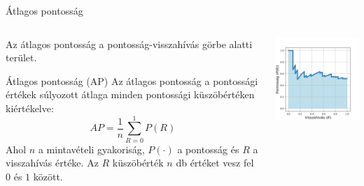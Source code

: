 \documentclass[english, aspectratio=169]{beamer}
\begin{document}
\begin{frame}{Átlagos pontosság}
\begin{columns}
\begin{column}{.5\textwidth}
Az átlagos pontosság a pontosság-visszahívás görbe alatti terület. 
\begin{block}{Átlagos pontosság (AP)}
Az átlagos pontosság a pontossági értékek súlyozott átlaga minden pontossági küszöbértéken kiértékelve:
\[
AP = \frac{1}{n} \sum_{R=0}^1 P(R)
\]
Ahol $n$ a mintavételi gyakoriság, $P(\cdot)$ a pontosság és $R$ a visszahívás értéke. Az $R$ küszöbérték $n$ db értéket vesz fel $0$ és $1$ között. 
\end{block}
\end{column}
\begin{column}{.5\textwidth}
\begin{center}
\includegraphics[width=7cm, keepaspectratio]{images/od_12.png}
\end{center}
\end{column}
\end{columns}
\end{frame}
\end{document}

